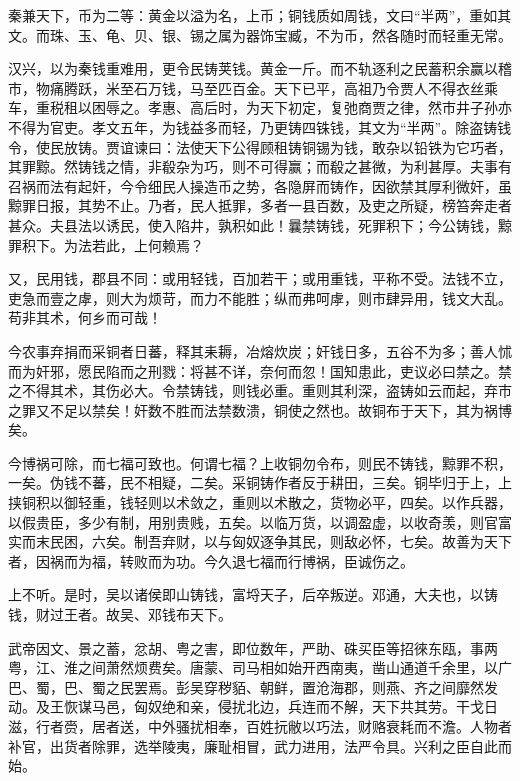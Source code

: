 \documentclass[12pt,UTF8]{ctexbook}
\begin{document}
秦兼天下，币为二等：黄金以溢为名，上币；铜钱质如周钱，文曰“半两”，重如其文。而珠、玉、龟、贝、银、锡之属为器饰宝臧，不为币，然各随时而轻重无常。



汉兴，以为秦钱重难用，更令民铸荚钱。黄金一斤。而不轨逐利之民蓄积余赢以稽市，物痛腾跃，米至石万钱，马至匹百金。天下已平，高祖乃令贾人不得衣丝乘车，重税租以困辱之。孝惠、高后时，为天下初定，复弛商贾之律，然市井子孙亦不得为官吏。孝文五年，为钱益多而轻，乃更铸四铢钱，其文为“半两”。除盗铸钱令，使民放铸。贾谊谏曰：法使天下公得顾租铸铜锡为钱，敢杂以铅铁为它巧者，其罪黥。然铸钱之情，非殽杂为巧，则不可得赢；而殽之甚微，为利甚厚。夫事有召祸而法有起奸，今令细民人操造币之势，各隐屏而铸作，因欲禁其厚利微奸，虽黥罪日报，其势不止。乃者，民人抵罪，多者一县百数，及吏之所疑，榜笞奔走者甚众。夫县法以诱民，使入陷井，孰积如此！曩禁铸钱，死罪积下；今公铸钱，黥罪积下。为法若此，上何赖焉？



又，民用钱，郡县不同：或用轻钱，百加若干；或用重钱，平称不受。法钱不立，吏急而壹之虖，则大为烦苛，而力不能胜；纵而弗呵虖，则市肆异用，钱文大乱。苟非其术，何乡而可哉！



今农事弃捐而采铜者日蕃，释其耒耨，冶熔炊炭；奸钱日多，五谷不为多；善人怵而为奸邪，愿民陷而之刑戮：将甚不详，奈何而忽！国知患此，吏议必曰禁之。禁之不得其术，其伤必大。令禁铸钱，则钱必重。重则其利深，盗铸如云而起，弃市之罪又不足以禁矣！奸数不胜而法禁数溃，铜使之然也。故铜布于天下，其为祸博矣。



今博祸可除，而七福可致也。何谓七福？上收铜勿令布，则民不铸钱，黥罪不积，一矣。伪钱不蕃，民不相疑，二矣。采铜铸作者反于耕田，三矣。铜毕归于上，上挟铜积以御轻重，钱轻则以术敛之，重则以术散之，货物必平，四矣。以作兵器，以假贵臣，多少有制，用别贵贱，五矣。以临万货，以调盈虚，以收奇羡，则官富实而末民困，六矣。制吾弃财，以与匈奴逐争其民，则敌必怀，七矣。故善为天下者，因祸而为福，转败而为功。今久退七福而行博祸，臣诚伤之。



上不听。是时，吴以诸侯即山铸钱，富埒天子，后卒叛逆。邓通，大夫也，以铸钱，财过王者。故吴、邓钱布天下。



武帝因文、景之蓄，忿胡、粤之害，即位数年，严助、硃买臣等招徠东瓯，事两粤，江、淮之间萧然烦费矣。唐蒙、司马相如始开西南夷，凿山通道千余里，以广巴、蜀，巴、蜀之民罢焉。彭吴穿秽貊、朝鲜，置沧海郡，则燕、齐之间靡然发动。及王恢谋马邑，匈奴绝和亲，侵扰北边，兵连而不解，天下共其劳。干戈日滋，行者赍，居者送，中外骚扰相奉，百姓抏敝以巧法，财赂衰耗而不澹。人物者补官，出货者除罪，选举陵夷，廉耻相冒，武力进用，法严令具。兴利之臣自此而始。
\end{document}
